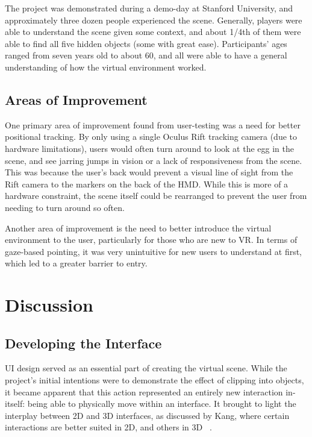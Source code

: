 \documentclass[10pt,twocolumn,letterpaper]{article}
\begin{document}
The project was demonstrated during a demo-day at Stanford University, and approximately three dozen people experienced the scene. Generally, players were able to understand the scene given some context, and about 1/4th of them were able to find all five hidden objects (some with great ease). Participants' ages ranged from seven years old to about 60, and all were able to have a general understanding of how the virtual environment worked.

\subsection{Areas of Improvement}

One primary area of improvement found from user-testing was a need for better positional tracking. By only using a single Oculus Rift tracking camera (due to hardware limitations), users would often turn around to look at the egg in the scene, and see jarring jumps in vision or a lack of responsiveness from the scene. This was because the user's back would prevent a visual line of sight from the Rift camera to the markers on the back of the HMD. While this is more of a hardware constraint, the scene itself could be rearranged to prevent the user from needing to turn around so often.

Another area of improvement is the need to better introduce the virtual environment to the user, particularly for those who are new to VR. In terms of gaze-based pointing, it was very unintuitive for new users to understand at first, which led to a greater barrier to entry.


\section{Discussion}

\subsection{Developing the Interface}

UI design served as an essential part of creating the virtual scene. While the project's initial intentions were to demonstrate the effect of clipping into objects, it became apparent that this action represented an entirely new interaction in-itself: being able to physically move within an interface. It brought to light the interplay between 2D and 3D interfaces, as discussed by Kang, where certain interactions are better suited in 2D, and others in 3D ~\cite{7892351}.
\end{document}
